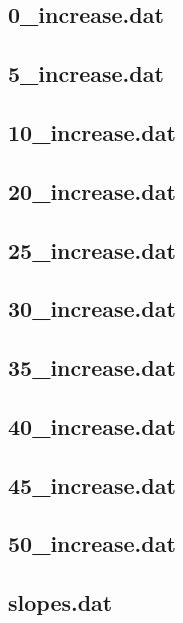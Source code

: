 \documentclass[notitlepage,12pt]{article}
\begin{document}
\subsection{0\_increase.dat}
\label{sec:0inc}



\subsection{5\_increase.dat}
\label{sec:5inc}



\subsection{10\_increase.dat}
\label{sec:10inc}



\subsection{20\_increase.dat}
\label{sec:20inc}



\subsection{25\_increase.dat}
\label{sec:25inc}



\subsection{30\_increase.dat}
\label{sec:30inc}



\subsection{35\_increase.dat}
\label{sec:35inc}



\subsection{40\_increase.dat}
\label{sec:40inc}



\subsection{45\_increase.dat}
\label{sec:45inc}



\subsection{50\_increase.dat}
\label{sec:50inc}



\subsection{slopes.dat}
\label{sec:slopes}






\end{document}
